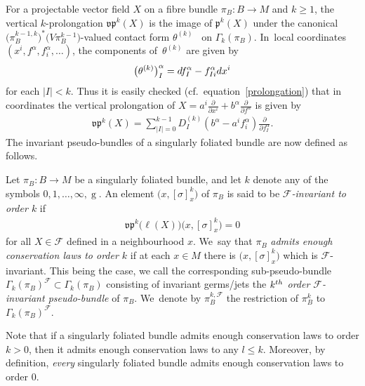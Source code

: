 \documentclass[11pt]{article}
\numberwithin{equation}{section}
\numberwithin{equation}{section}
\def\g{\operatorname{g}}
\def\FF{{\mathcal{F}}}
\def\pf{{\mathfrak{p}}}
\def\vpf{{\mathfrak{vp}}}
\begin{document}
For a projectable vector field $X$ on a fibre bundle $\pi_{B}\colon B\rightarrow M$ and $k\geq1$, the vertical $k$-prolongation $\vpf^{k}(X)$ is the image of $\pf^{k}(X)$ under the canonical $\big(\pi_{B}^{k-1,k}\big)^{*}\big(V\pi_{B}^{k-1}\big)$-valued contact form $\theta^{(k)}$~\cite[Chapter~6.3]{saunders} on $\Gamma_{k}(\pi_{B})$. In~local coordinates $(x^{i},f^{\alpha},f^{\alpha}_{i},\dots)$, the components of~$\theta^{(k)}$ are given by
\begin{gather*}
\big(\theta^{(k)}\big)^{\alpha}_{I} = {\rm d}f^{\alpha}_{I} - f^{\alpha}_{Ii}{\rm d}x^{i}
\end{gather*}
for each $|I|<k$. Thus it is easily checked (cf.~equation~\eqref{prolongation}) that in coordinates the vertical prolongation of $X = a^{i}\frac{\partial}{\partial x^{i}}+b^{\alpha}\frac{\partial}{\partial f^{\alpha}}$ is given by
\begin{gather*}
\vpf^{k}(X) = \sum_{|I|=0}^{k-1}D_{I}^{(k)}(b^{\alpha}-a^{i}f^{\alpha}_{i})\frac{\partial}{\partial f^{\alpha}_{I}}.
\end{gather*}
The invariant pseudo-bundles of a singularly foliated bundle are now defined as follows.

\begin{Definition}\label{FFinv}
Let $\pi_{B}\colon B\rightarrow M$ be a singularly foliated bundle, and let $k$ denote any of the symbols $0,1,\dots,\infty,\g$. An element $\big(x,[\sigma]^{k}_{x}\big)$ of $\pi_{B}$ is said to be \textit{$\FF$-invariant to order $k$} if
\begin{gather*}
\vpf^{k}\big(\ell(X)\big)\big(x,[\sigma]^{k}_{x}\big) = 0
\end{gather*}
for all $X\in\FF$ defined in a neighbourhood $x$. We~say that $\pi_{B}$ \textit{admits enough conservation laws to order $k$} if at each $x\in M$ there is $\big(x,[\sigma]^{k}_{x}\big)$ which is $\FF$-invariant. This being the case, we call the corresponding sub-pseudo-bundle $\Gamma_{k}(\pi_{B})^{\FF}\subset\Gamma_{k}(\pi_{B})$ consisting of invariant germs/jets the \textit{$k^{\rm th}$ order $\FF$-invariant pseudo-bundle} of $\pi_{B}$. We~denote by $\pi_{B}^{k,\FF}$ the restriction of $\pi_{B}^{k}$ to $\Gamma_{k}(\pi_{B})^{\FF}$.
\end{Definition}

Note that if a singularly foliated bundle admits enough conservation laws to order $k>0$, then it admits enough conservation laws to any $l\leq k$. Moreover, by definition, \textit{every} singularly foliated bundle admits enough conservation laws to order 0.
\end{document}
